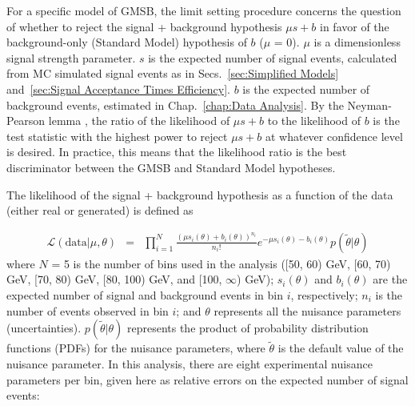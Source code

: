 \documentclass[dissertation.tex]{subfiles}
\begin{document}
For a specific model of GMSB, the limit setting procedure concerns the question of whether to reject the signal + background hypothesis $\mu s + b$ in favor of the background-only (Standard Model) hypothesis of $b$ ($\mu$ = 0).  $\mu$ is a dimensionless signal strength parameter.  $s$ is the expected number of signal events, calculated from MC simulated signal events as in Secs.~\ref{sec:Simplified Models} and~\ref{sec:Signal Acceptance Times Efficiency}.  $b$ is the expected number of background events, estimated in Chap.~\ref{chap:Data Analysis}.  By the Neyman-Pearson lemma \cite{Neyman_Pearson}, the ratio of the likelihood of $\mu s + b$ to the likelihood of $b$ is the test statistic with the highest power to reject $\mu s + b$ at whatever confidence level is desired.  In practice, this means that the likelihood ratio is the best discriminator between the GMSB and Standard Model hypotheses.

The likelihood of the signal + background hypothesis as a function of the data (either real or generated) is defined as 

\begin{eqnarray}
\label{eq:L_sb}
\mathcal{L}(\mbox{data} | \mu, \theta) &=& \prod_{i = 1}^{N} \frac{(\mu s_{i}(\theta) + b_{i}(\theta))^{n_{i}}}{n_{i}!}e^{-\mu s_{i}(\theta) - b_{i}(\theta)}p(\tilde{\theta} | \theta)
\end{eqnarray}
%
where $N$ = 5 is the number of \MET bins used in the analysis ([50, 60) GeV, [60, 70) GeV, [70, 80) GeV, [80, 100) GeV, and [100, $\infty$) GeV); $s_{i}(\theta)$ and $b_{i}(\theta)$ are the expected number of signal and background events in \MET bin $i$, respectively; $n_{i}$ is the number of events observed in \MET bin $i$; and $\theta$ represents all the nuisance parameters (uncertainties).  $p(\tilde{\theta} | \theta)$ represents the product of probability distribution functions (PDFs) for the nuisance parameters, where $\tilde{\theta}$ is the default value of the nuisance parameter.  In this analysis, there are eight experimental nuisance parameters per \MET bin, given here as relative errors on the expected number of signal events:
\end{document}
